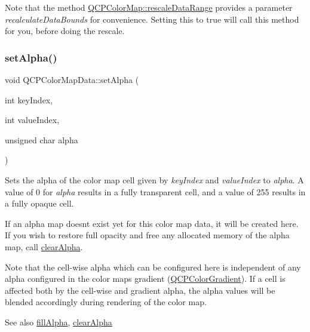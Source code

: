 Note that the method \hyperlink{classQCPColorMap_a856608fa3dd1cc290bcd5f29a5575774}{Q\+C\+P\+Color\+Map\+::rescale\+Data\+Range} provides a parameter {\itshape recalculate\+Data\+Bounds} for convenience. Setting this to true will call this method for you, before doing the rescale. \mbox{\label{classQCPColorMapData_aaf7de5b34c58f38d8f4c1ceb064a876c}} 
\subsubsection{\texorpdfstring{set\+Alpha()}{setAlpha()}}
{\footnotesize\ttfamily void Q\+C\+P\+Color\+Map\+Data\+::set\+Alpha (\begin{DoxyParamCaption}\item[{int}]{key\+Index,  }\item[{int}]{value\+Index,  }\item[{unsigned char}]{alpha }\end{DoxyParamCaption})}

Sets the alpha of the color map cell given by {\itshape key\+Index} and {\itshape value\+Index} to {\itshape alpha}. A value of 0 for {\itshape alpha} results in a fully transparent cell, and a value of 255 results in a fully opaque cell.

If an alpha map doesn\textquotesingle{}t exist yet for this color map data, it will be created here. If you wish to restore full opacity and free any allocated memory of the alpha map, call \hyperlink{classQCPColorMapData_a14d08b9c3720cd719400079b86d3906b}{clear\+Alpha}.

Note that the cell-\/wise alpha which can be configured here is independent of any alpha configured in the color map\textquotesingle{}s gradient (\hyperlink{classQCPColorGradient}{Q\+C\+P\+Color\+Gradient}). If a cell is affected both by the cell-\/wise and gradient alpha, the alpha values will be blended accordingly during rendering of the color map.

\begin{DoxySeeAlso}{See also}
\hyperlink{classQCPColorMapData_a93e2a549d7702bc849cd48a585294657}{fill\+Alpha}, \hyperlink{classQCPColorMapData_a14d08b9c3720cd719400079b86d3906b}{clear\+Alpha} 
\end{DoxySeeAlso}
\mbox{\label{classQCPColorMapData_a8e75eaf8746596319032a93f3d2d0683}} 
